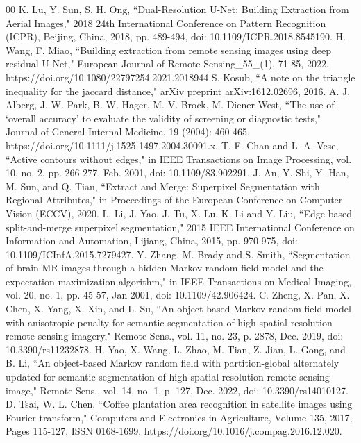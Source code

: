 \documentclass{jsarticle}
\theoremstyle{definition}
\begin{document}
\begin{thebibliography}{00}
   K. Lu, Y. Sun, S. H. Ong, ``Dual-Resolution U-Net: Building Extraction from Aerial Images," 2018 24th International Conference on Pattern Recognition (ICPR), Beijing, China, 2018, pp. 489-494, doi: 10.1109/ICPR.2018.8545190. 
   H. Wang, F. Miao, ``Building extraction from remote sensing images using deep residual U-Net," European Journal of Remote Sensing\_55\_(1), 71-85, 2022, https://doi.org/10.1080/22797254.2021.2018944
   S. Kosub, ``A note on the triangle inequality for the jaccard distance," arXiv preprint arXiv:1612.02696, 2016.
   A. J. Alberg, J. W. Park, B. W. Hager, M. V. Brock, M. Diener‐West, ``The use of `overall accuracy' to evaluate the validity of screening or diagnostic tests," Journal of General Internal Medicine, 19 (2004): 460-465. https://doi.org/10.1111/j.1525-1497.2004.30091.x.
   T. F. Chan and L. A. Vese, ``Active contours without edges," in IEEE Transactions on Image Processing, vol. 10, no. 2, pp. 266-277, Feb. 2001, doi: 10.1109/83.902291.
   J. An, Y. Shi, Y. Han, M. Sun, and Q. Tian, ``Extract and Merge: Superpixel Segmentation with Regional Attributes," in Proceedings of the European Conference on Computer Vision (ECCV), 2020.
   L. Li, J. Yao, J. Tu, X. Lu, K. Li and Y. Liu, ``Edge-based split-and-merge superpixel segmentation," 2015 IEEE International Conference on Information and Automation, Lijiang, China, 2015, pp. 970-975, doi: 10.1109/ICInfA.2015.7279427.
   Y. Zhang, M. Brady and S. Smith, ``Segmentation of brain MR images through a hidden Markov random field model and the expectation-maximization algorithm," in IEEE Transactions on Medical Imaging, vol. 20, no. 1, pp. 45-57, Jan 2001, doi: 10.1109/42.906424.
   C. Zheng, X. Pan, X. Chen, X. Yang, X. Xin, and L. Su, ``An object-based Markov random field model with anisotropic penalty for semantic segmentation of high spatial resolution remote sensing imagery," Remote Sens., vol. 11, no. 23, p. 2878, Dec. 2019, doi: 10.3390/rs11232878.
   H. Yao, X. Wang, L. Zhao, M. Tian, Z. Jian, L. Gong, and B. Li, ``An object-based Markov random field with partition-global alternately updated for semantic segmentation of high spatial resolution remote sensing image," Remote Sens., vol. 14, no. 1, p. 127, Dec. 2022, doi: 10.3390/rs14010127.
   D. Tsai, W. L. Chen, ``Coffee plantation area recognition in satellite images using Fourier transform," Computers and Electronics in Agriculture, Volume 135, 2017, Pages 115-127, ISSN 0168-1699, https://doi.org/10.1016/j.compag.2016.12.020.

\end{thebibliography}
\end{document}
